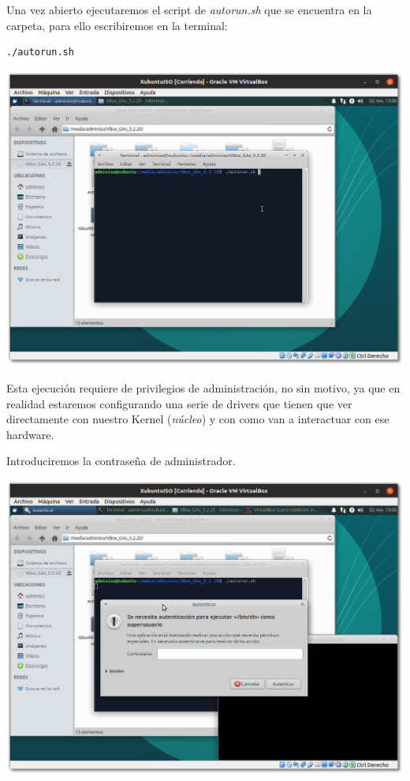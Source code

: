 \documentclass[11pt]{article}
\begin{document}
Una vez abierto ejecutaremos el script de \emph{autorun.sh} que se encuentra
en la carpeta, para ello escribiremos en la terminal:

\begin{verbatim}
./autorun.sh
\end{verbatim}

\begin{center}
\includegraphics[width=.9\linewidth]{imgs/VBox_GuestAdd_LinuX_017.png}
\end{center}

Esta ejecución requiere de privilegios de administración, no sin motivo,
ya que en realidad estaremos configurando una serie de drivers que
tienen que ver directamente con nuestro Kernel (\emph{núcleo}) y con como van
a interactuar con ese hardware.

Introduciremos la contraseña de administrador.

\begin{center}
\includegraphics[width=.9\linewidth]{imgs/VBox_GuestAdd_LinuX_018.png}
\end{center}
\end{document}
